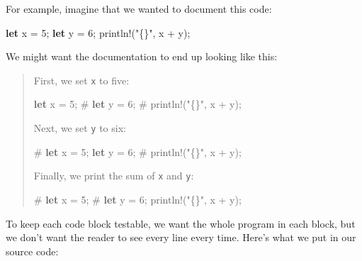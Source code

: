 \documentclass[a4paper,]{book}
\newenvironment{Shaded}{\begin{snugshade}}{\end{snugshade}}
\newcommand{\KeywordTok}[1]{\textcolor[rgb]{0.13,0.29,0.53}{\textbf{{#1}}}}
\newcommand{\DecValTok}[1]{\textcolor[rgb]{0.00,0.00,0.81}{{#1}}}
\newcommand{\StringTok}[1]{\textcolor[rgb]{0.31,0.60,0.02}{{#1}}}
\newcommand{\OtherTok}[1]{\textcolor[rgb]{0.56,0.35,0.01}{{#1}}}
\newcommand{\NormalTok}[1]{{#1}}
\begin{document}
For example, imagine that we wanted to document this code:

\begin{Shaded}
\begin{Highlighting}[]
\KeywordTok{let} \NormalTok{x = }\DecValTok{5}\NormalTok{;}
\KeywordTok{let} \NormalTok{y = }\DecValTok{6}\NormalTok{;}
\OtherTok{println!}\NormalTok{(}\StringTok{"\{\}"}\NormalTok{, x + y);}
\end{Highlighting}
\end{Shaded}

We might want the documentation to end up looking like this:

\begin{quote}
First, we set \texttt{x} to five:

\begin{Shaded}
\begin{Highlighting}[]
\KeywordTok{let} \NormalTok{x = }\DecValTok{5}\NormalTok{;}
\NormalTok{# }\KeywordTok{let} \NormalTok{y = }\DecValTok{6}\NormalTok{;}
\NormalTok{# }\OtherTok{println!}\NormalTok{(}\StringTok{"\{\}"}\NormalTok{, x + y);}
\end{Highlighting}
\end{Shaded}

Next, we set \texttt{y} to six:

\begin{Shaded}
\begin{Highlighting}[]
\NormalTok{# }\KeywordTok{let} \NormalTok{x = }\DecValTok{5}\NormalTok{;}
\KeywordTok{let} \NormalTok{y = }\DecValTok{6}\NormalTok{;}
\NormalTok{# }\OtherTok{println!}\NormalTok{(}\StringTok{"\{\}"}\NormalTok{, x + y);}
\end{Highlighting}
\end{Shaded}

Finally, we print the sum of \texttt{x} and \texttt{y}:

\begin{Shaded}
\begin{Highlighting}[]
\NormalTok{# }\KeywordTok{let} \NormalTok{x = }\DecValTok{5}\NormalTok{;}
\NormalTok{# }\KeywordTok{let} \NormalTok{y = }\DecValTok{6}\NormalTok{;}
\OtherTok{println!}\NormalTok{(}\StringTok{"\{\}"}\NormalTok{, x + y);}
\end{Highlighting}
\end{Shaded}
\end{quote}

To keep each code block testable, we want the whole program in each
block, but we don't want the reader to see every line every time. Here's
what we put in our source code:
\end{document}
